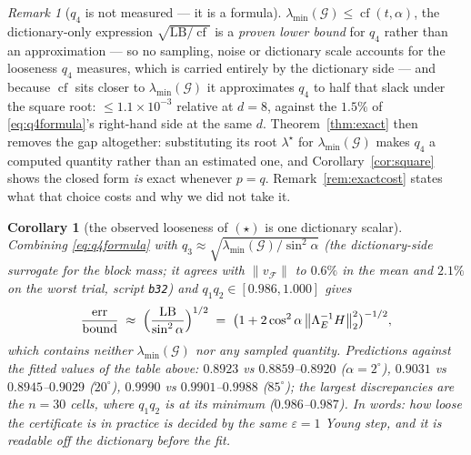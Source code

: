 \documentclass[11pt]{article}
\newtheorem{corollary}[theorem]{Corollary}
\theoremstyle{remark}
\newtheorem{remark}{Remark}[section]
\newcommand{\Gr}{\mathcal{G}}
\newcommand{\Le}{\Lambda_E}
\newcommand{\Cnorm}{\bigl\|\Le^{-1}H\bigr\|_2^2}
\begin{document}
\begin{remark}[$q_4$ is not measured --- it is a formula]
$\lambda_{\min}(\Gr)\le\operatorname{cf}(t,\alpha)$, the dictionary-only expression
$\sqrt{\mathrm{LB}/\operatorname{cf}}$ is a \emph{proven lower bound} for $q_4$ rather than an
approximation --- so no sampling, noise or dictionary scale accounts for the looseness $q_4$
measures, which is carried entirely by the dictionary side --- and because $\operatorname{cf}$ sits
closer to $\lambda_{\min}(\Gr)$ it approximates $q_4$ to half that slack under the square root:
$\le1.1\times10^{-3}$ relative at $d=8$, against the $1.5\%$ of \eqref{eq:q4formula}'s right-hand
side at the same $d$. Theorem~\ref{thm:exact} then removes the gap altogether: substituting its root
$\lambda^{\star}$ for $\lambda_{\min}(\Gr)$ makes $q_4$ a computed quantity rather than an estimated
one, and Corollary~\ref{cor:square} shows the closed form \emph{is} exact whenever $p=q$.
Remark~\ref{rem:exactcost} states what that choice costs and why we did not take it.
\end{remark}

\begin{corollary}[the observed looseness of $(\star)$ is one dictionary scalar]
\label{cor:slackone}
Combining \eqref{eq:q4formula} with $q_3\approx\sqrt{\lambda_{\min}(\Gr)/\sin^2\alpha}$
(the dictionary-side surrogate for the block mass; it agrees with $\|v_{\mathcal F}\|$ to
$0.6\%$ in the mean and $2.1\%$ on the worst trial, script \texttt{b32}) and
$q_1q_2\in[0.986,1.000]$ gives
\begin{equation}\label{eq:slackone}
  \frac{\text{err}}{\text{bound}}
  \;\approx\;\Bigl(\frac{\mathrm{LB}}{\sin^2\alpha}\Bigr)^{1/2}
  \;=\;\bigl(1+2\cos^2\alpha\,\Cnorm\bigr)^{-1/2},
\end{equation}
which contains neither $\lambda_{\min}(\Gr)$ nor any sampled quantity.
Predictions against the fitted values of the table above:
$0.8923$ vs $0.8859$--$0.8920$ ($\alpha=2^\circ$), $0.9031$ vs $0.8945$--$0.9029$
($20^\circ$), $0.9990$ vs $0.9901$--$0.9988$ ($85^\circ$); the largest discrepancies are the
$n=30$ cells, where $q_1q_2$ is at its minimum ($0.986$--$0.987$).
In words: how loose the certificate is in practice is decided by the same
$\varepsilon=1$ Young step, and it is readable off the dictionary before the fit.
\end{corollary}
\end{document}
